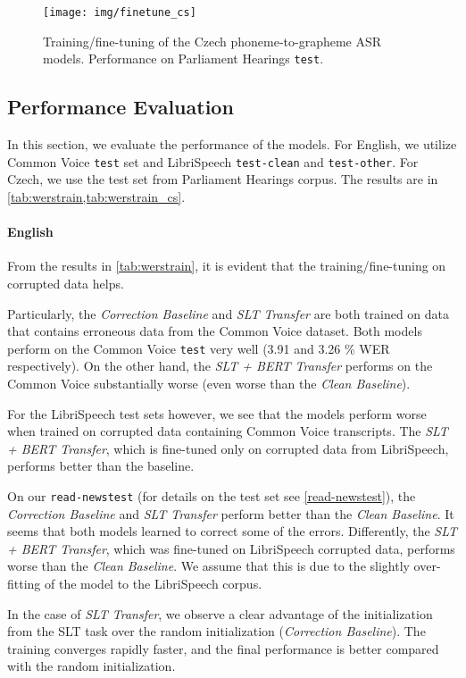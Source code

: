 \begin{figure}[h]
	\texttt{[image: img/finetune\_cs]}
	\caption[Czech enhanced ASR fine-tuning]{Training/fine-tuning of the Czech phoneme-to-grapheme ASR models. Performance on Parliament Hearings \texttt{test}.}
	\label{fig:finetune_cs}
\end{figure}

\subsection{Performance Evaluation}
In this section, we evaluate the performance of the models. For English, we utilize Common Voice \texttt{test} set and LibriSpeech \texttt{test-clean} and \texttt{test-other}. For Czech, we use the test set from Parliament Hearings corpus. The results are in \cref{tab:werstrain,tab:werstrain_cs}.

\paragraph{English} 
From the results in \cref{tab:werstrain}, it is evident that the training/fine-tuning on corrupted data helps. 

Particularly, the \emph{Correction Baseline} and \emph{SLT Transfer} are both trained on data that contains erroneous data from the Common Voice dataset. Both models perform on the Common Voice \texttt{test} very well (3.91 and 3.26 \% WER respectively). On the other hand, the \emph{SLT + BERT Transfer} performs on the Common Voice substantially worse (even worse than the \emph{Clean Baseline}). 

For the LibriSpeech test sets however, we see that the models perform worse when trained on corrupted data containing Common Voice transcripts. The \emph{SLT + BERT Transfer}, which is fine-tuned only on corrupted data from LibriSpeech, performs better than the baseline.

On our \texttt{read-newstest} (for details on the test set see \cref{read-newstest}), the \emph{Correction Baseline} and \emph{SLT Transfer} perform better than the \emph{Clean Baseline}. It seems that both models learned to correct some of the errors. Differently, the \emph{SLT + BERT Transfer}, which was fine-tuned on LibriSpeech corrupted data, performs worse than the \emph{Clean Baseline}. We assume that this is due to the slightly over-fitting of the model to the LibriSpeech corpus.

In the case of \emph{SLT Transfer}, we observe a clear advantage of the initialization from the SLT task over the random initialization (\emph{Correction Baseline}). The training converges rapidly faster, and the final performance is better compared with the random initialization.


